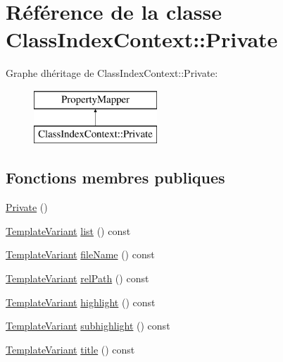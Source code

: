 \hypertarget{class_class_index_context_1_1_private}{}\section{Référence de la classe Class\+Index\+Context\+:\+:Private}
\label{class_class_index_context_1_1_private}
Graphe d\textquotesingle{}héritage de Class\+Index\+Context\+:\+:Private\+:\begin{figure}[H]
\begin{center}
\leavevmode
\includegraphics[height=2.000000cm]{class_class_index_context_1_1_private}
\end{center}
\end{figure}
\subsection*{Fonctions membres publiques}
\begin{DoxyCompactItemize}
\item 
\hyperlink{class_class_index_context_1_1_private_a4d653810bc3f5b1aa40e739e781ede94}{Private} ()
\item 
\hyperlink{class_template_variant}{Template\+Variant} \hyperlink{class_class_index_context_1_1_private_acb426e9c2f871c641a0c2ba10ce420a6}{list} () const 
\item 
\hyperlink{class_template_variant}{Template\+Variant} \hyperlink{class_class_index_context_1_1_private_a0b678be08552d83e04c4ea944578a089}{file\+Name} () const 
\item 
\hyperlink{class_template_variant}{Template\+Variant} \hyperlink{class_class_index_context_1_1_private_afcfd434a74fae967bdfc26146ab071ea}{rel\+Path} () const 
\item 
\hyperlink{class_template_variant}{Template\+Variant} \hyperlink{class_class_index_context_1_1_private_ae9740c8cfd9127c158fce17a86e7df01}{highlight} () const 
\item 
\hyperlink{class_template_variant}{Template\+Variant} \hyperlink{class_class_index_context_1_1_private_a262e541785b7d535ccbba1c0e1433b54}{subhighlight} () const 
\item 
\hyperlink{class_template_variant}{Template\+Variant} \hyperlink{class_class_index_context_1_1_private_aa694d29a5ca6cc1553cad59c797dcde1}{title} () const 
\end{DoxyCompactItemize}


